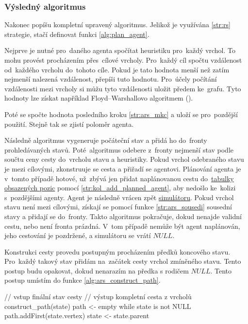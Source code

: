 \subsubsection{Výsledný algoritmus}\label{subsubsec:ars_vysledny_algoritmus}

Nakonec popíšu kompletní upravený  algoritmus.
Jelikož je využívána \ref{str:rs} strategie, stačí definovat funkci \ref{alg:plan_agent}.

Nejprve je nutné pro~daného agenta spočítat heuristiku pro~každý vrchol.
To mohu provést procházením přes~cílové vrcholy.
Pro~každý cíl spočtu vzdálenost od~každého vrcholu do~tohoto cíle.
Pokud je tato hodnota menší než zatím nejmenší nalezená vzdálenost, přepíši tuto hodnotu.
Pro~účely počítání vzdálenosti mezi vrcholy si můžu tyto vzdálenosti uložit předem ke~grafu.
Tyto hodnoty lze získat například Floyd–Warshallovo algoritmem (\citet*{Floyd-Warshall}).

Poté se spočte hodnota posledního kroku \ref{str:ars_mkc} a uloží se pro~pozdější použití.
Stejně tak se zjistí poloměr agenta.

Následně algoritmus vygeneruje počáteční stav a přidá ho do~fronty prohledávaných stavů.
Poté~algoritmus odebere z~fronty nejmenší stav podle součtu ceny cesty do~vrcholu stavu a heuristiky.
Pokud vrchol odebraného stavu je mezi cílovými, zkonstruuje se cesta a přiřadí se agentovi.
Plánování agenta je v~tomto případě hotové, už~zbývá jen přidat naplánovanou cestu
do~\hyperref[par:obsazene_pozice]{tabulky obsazených pozic} pomocí \ref{str:kol_add_planned_agent},
aby nedošlo ke~kolizi s~pozdějšími agenty.
Agent je následně vrácen zpět \hyperref[sec:simulace]{simulátoru}.
Pokud vrchol stavu není mezi cílovými,
získají se pomocí funkce \ref{str:ars_sousedi} sousední stavy a přidají se do~fronty.
Takto algoritmus pokračuje, dokud nenajde validní cestu, nebo není fronta prázdná.
V~tom případě nemůže být agent naplánován, jeho cestování je pozdržené, a simulátoru se vrátí $NULL$.

Konstrukci cesty provedu postupným procházením předků koncového stavu.
Pro~každý takový stav přidám na~začátek cesty vrchol zmíněného stavu.
Tento postup budu opakovat, dokud nenarazím na předka s rodičem $NULL$.
Tento postup umístím do funkce \ref{alg:ars_construct_path}.

\begin{code}[fontsize=\footnotesize]
// vstup finální stav cesty
// výstup kompletní cesta z vrcholů
construct_path(state)
  path <- empty
  while state is not NULL
    path.addFirst(state.vertex)
    state <- state.parent
\end{code}


